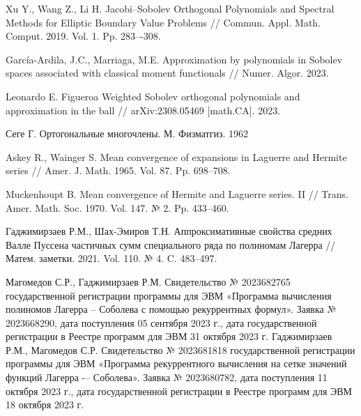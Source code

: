 \begin{thebibliography}{111}
{Xu Y., Wang Z., Li H.} Jacobi–Sobolev Orthogonal Polynomials and Spectral Methods for Elliptic Boundary Value Problems //
Commun. Appl. Math. Comput. 2019. Vol. 1. Pp. 283–-308.

{Garc\'ia-Ardila, J.C., Marriaga, M.E.} Approximation by polynomials in Sobolev spaces associated with classical moment functionals //
Numer. Algor. 2023.

{Leonardo E. Figueroa} Weighted Sobolev orthogonal polynomials and approximation in the ball // arXiv:2308.05469 [math.CA]. 2023.

{Сеге Г.} Ортогональные многочлены. М. Физматгиз. 1962

{Askey R., Wainger S.} Mean convergence of expansions in Laguerre and Hermite series // Amer. J. Math. 1965. Vol. 87. Pp. 698--708.

{Muckenhoupt B.} Mean convergence of Hermite and Laguerre series. II // Trans. Amer. Math. Soc. 1970. Vol. 147. № 2. Pp. 433--460.

{Гаджимирзаев Р.М., Шах-Эмиров Т.Н.} Аппроксимативные свойства средних Валле Пуссена частичных сумм специального ряда по полиномам Лагерра //
Матем. заметки. 2021. Vol. 110. № 4. C. 483--497.												

{Магомедов С.Р., Гаджимирзаев Р.М.} Свидетельство № 2023682765 государственной регистрации программы для ЭВМ «Программа вычисления полиномов Лагерра -- Соболева с помощью рекуррентных формул». Заявка № 2023668290, дата поступления 05 сентября 2023 г., дата государственной регистрации в Реестре программ для ЭВМ 31 октября 2023 г.
{Гаджимирзаев Р.М., Магомедов С.Р.} Свидетельство № 2023681818 государственной регистрации программы для ЭВМ «Программа рекуррентного вычисления на сетке значений функций Лагерра -– Соболева». Заявка № 2023680782, дата поступления 11 октября 2023 г., дата государственной регистрации в Реестре программ для ЭВМ 18 октября 2023 г.


%
%
%
%
%




\end{thebibliography}
